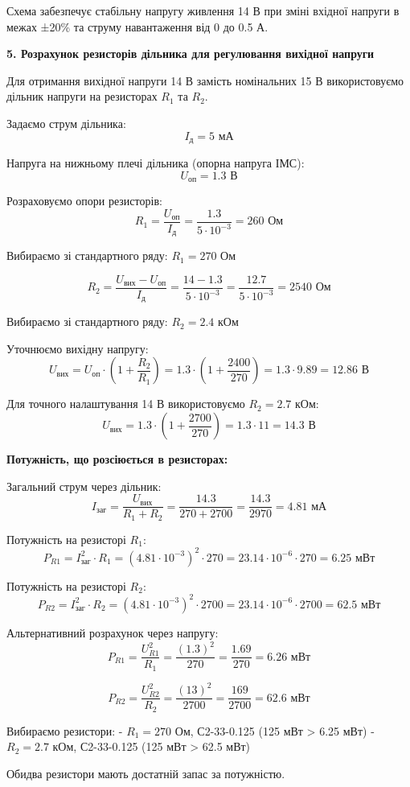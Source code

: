 \documentclass[main.tex]{subfiles}
\begin{document}
Схема забезпечує стабільну напругу живлення 14 В при зміні вхідної напруги в межах ±20\% та струму навантаження від 0 до 0.5 А.

\textbf{5. Розрахунок резисторів дільника для регулювання вихідної напруги}

Для отримання вихідної напруги 14 В замість номінальних 15 В використовуємо дільник напруги на резисторах $R_1$ та $R_2$.

Задаємо струм дільника:
\[I_{\text{д}} = 5\text{ мА}\]

Напруга на нижньому плечі дільника (опорна напруга ІМС):
\[U_{\text{оп}} = 1.3\text{ В}\]

Розраховуємо опори резисторів:
\[R_1 = \frac{U_{\text{оп}}}{I_{\text{д}}} = \frac{1.3}{5 \cdot 10^{-3}} = 260\text{ Ом}\]

Вибираємо зі стандартного ряду: $R_1 = 270\text{ Ом}$

\[R_2 = \frac{U_{\text{вих}} - U_{\text{оп}}}{I_{\text{д}}} = \frac{14 - 1.3}{5 \cdot 10^{-3}} = \frac{12.7}{5 \cdot 10^{-3}} = 2540\text{ Ом}\]

Вибираємо зі стандартного ряду: $R_2 = 2.4\text{ кОм}$

Уточнюємо вихідну напругу:
\[U_{\text{вих}} = U_{\text{оп}} \cdot \left(1 + \frac{R_2}{R_1}\right) = 1.3 \cdot \left(1 + \frac{2400}{270}\right) = 1.3 \cdot 9.89 = 12.86\text{ В}\]

Для точного налаштування 14 В використовуємо $R_2 = 2.7\text{ кОм}$:
\[U_{\text{вих}} = 1.3 \cdot \left(1 + \frac{2700}{270}\right) = 1.3 \cdot 11 = 14.3\text{ В}\]

\textbf{Потужність, що розсіюється в резисторах:}

Загальний струм через дільник:
\[I_{\text{заг}} = \frac{U_{\text{вих}}}{R_1 + R_2} = \frac{14.3}{270 + 2700} = \frac{14.3}{2970} = 4.81\text{ мА}\]

Потужність на резисторі $R_1$:
\[P_{R1} = I_{\text{заг}}^2 \cdot R_1 = (4.81 \cdot 10^{-3})^2 \cdot 270 = 23.14 \cdot 10^{-6} \cdot 270 = 6.25\text{ мВт}\]

Потужність на резисторі $R_2$:
\[P_{R2} = I_{\text{заг}}^2 \cdot R_2 = (4.81 \cdot 10^{-3})^2 \cdot 2700 = 23.14 \cdot 10^{-6} \cdot 2700 = 62.5\text{ мВт}\]

Альтернативний розрахунок через напругу:
\[P_{R1} = \frac{U_{R1}^2}{R_1} = \frac{(1.3)^2}{270} = \frac{1.69}{270} = 6.26\text{ мВт}\]

\[P_{R2} = \frac{U_{R2}^2}{R_2} = \frac{(13)^2}{2700} = \frac{169}{2700} = 62.6\text{ мВт}\]

Вибираємо резистори:
- $R_1 = 270\text{ Ом}$, С2-33-0.125 (125 мВт > 6.25 мВт)
- $R_2 = 2.7\text{ кОм}$, С2-33-0.125 (125 мВт > 62.5 мВт)

Обидва резистори мають достатній запас за потужністю.
\end{document}

